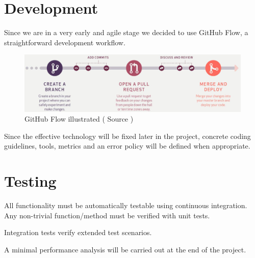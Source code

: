 \section{Development}

Since we are in a very early and agile stage we decided to use GitHub Flow\cite{github-flow}, a straightforward development workflow.

\begin{figure}[H]
	\centering
	\includegraphics[width=0.85\linewidth]{resources/github_flow}
	\caption[Organigram]{GitHub Flow illustrated ( Source \cite{github-flow})}
	\label{fig:organigram}
\end{figure}


Since the effective technology will be fixed later in the project, concrete coding guidelines, tools, metrics and an error policy will be defined when appropriate.


\section{Testing}
All functionality must be automatically testable using continuous integration. Any non-trivial function/method must be verified with unit tests.

Integration tests verify extended test scenarios.

A minimal performance analysis will be carried out at the end of the project.



\label{lastpage} %

\backmatter
{}






